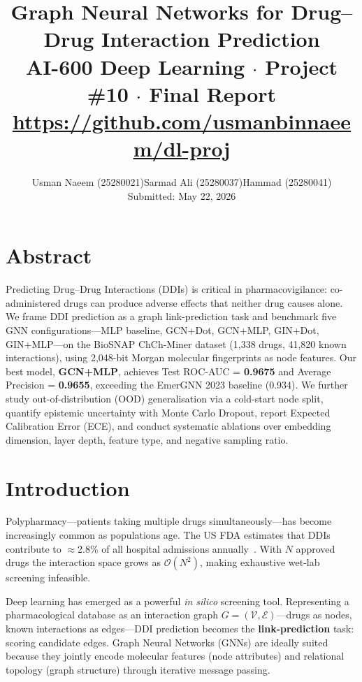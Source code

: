 \documentclass[10pt,twocolumn]{article}
\title{%
  \textbf{Graph Neural Networks for Drug–Drug Interaction Prediction}\\[4pt]
  \normalsize AI-600 Deep Learning $\cdot$ Project \#10 $\cdot$ Final Report\\[2pt]
  \small \href{https://github.com/usmanbinnaeem/dl-proj}{https://github.com/usmanbinnaeem/dl-proj}
}
\author{%
  Usman Naeem (25280021)\quad Sarmad Ali (25280037)\quad Hammad (25280041)\\
  \small Submitted: May 22, 2026
}
\date{}
\begin{document}
\maketitle
\thispagestyle{empty}

\section*{Abstract}
Predicting Drug–Drug Interactions (DDIs) is critical in pharmacovigilance:
co-administered drugs can produce adverse effects that neither drug causes alone.
We frame DDI prediction as a graph link-prediction task and benchmark five GNN
configurations—MLP baseline, GCN+Dot, GCN+MLP, GIN+Dot, GIN+MLP—on the BioSNAP
ChCh-Miner dataset (1{,}338 drugs, 41{,}820 known interactions), using 2{,}048-bit
Morgan molecular fingerprints as node features.
Our best model, \textbf{GCN+MLP}, achieves Test ROC-AUC = \textbf{0.9675} and
Average Precision = \textbf{0.9655}, exceeding the EmerGNN 2023 baseline (0.934).
We further study out-of-distribution (OOD) generalisation via a cold-start node
split, quantify epistemic uncertainty with Monte Carlo Dropout, report Expected
Calibration Error (ECE), and conduct systematic ablations over embedding dimension,
layer depth, feature type, and negative sampling ratio.

\section{Introduction}
Polypharmacy—patients taking multiple drugs simultaneously—has become increasingly
common as populations age.
The US FDA estimates that DDIs contribute to $\approx$2.8\% of all hospital
admissions annually~\cite{ito2004}.
With $N$ approved drugs the interaction space grows as $\mathcal{O}(N^2)$,
making exhaustive wet-lab screening infeasible.

Deep learning has emerged as a powerful \emph{in silico} screening tool.
Representing a pharmacological database as an interaction graph
$G{=}(\mathcal{V},\mathcal{E})$—drugs as nodes, known interactions as edges—DDI
prediction becomes the \textbf{link-prediction} task: scoring candidate edges.
Graph Neural Networks (GNNs) are ideally suited because they jointly encode
molecular features (node attributes) and relational topology (graph structure)
through iterative message passing.
\end{document}
